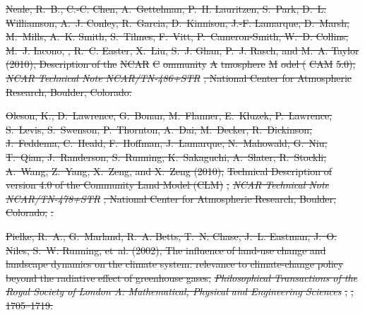 \documentclass[draft,ms]{agutex}   %
\providecommand{\DIFdel}[1]{{\protect\color{red}\sout{#1}}}                      %
\begin{document}
\begin{article}
\DIFdel{Neale, R.~B., C.-C. Chen, A.~Gettelman, P.~H. Lauritzen, S.~Park, D.~L.
  Williamson, A.~J. Conley, R.~Garcia, D.~Kinnison, J.-F. Lamarque, D.~Marsh,
  M.~Mills, A.~K. Smith, S.~Tilmes, F.~Vitt, P.~Cameron-Smith, W.~D. Collins,
  M.~J. Iacono, , R.~C. Easter, X.~Liu, S.~J. Ghan, P.~J. Rasch, and M.~A.
  Taylor (2010), Description of the }%
\DIFdel{NCAR}%
\DIFdel{C}%
\DIFdel{ommunity }%
\DIFdel{A}%
\DIFdel{tmosphere }%
\DIFdel{M}%
\DIFdel{odel
  (}%
\DIFdel{CAM}%
\DIFdel{5.0), }\textit{\DIFdel{NCAR Technical Note NCAR/TN-486+STR}}%
\DIFdel{, National Center
  for Atmospheric Research, Boulder, Colorado.
}%

\DIFdel{Oleson, K., D.~Lawrence, G.~Bonan, M.~Flanner, E.~Kluzek, P.~Lawrence,
  S.~Levis, S.~Swenson, P.~Thornton, A.~Dai, M.~Decker, R.~Dickinson,
  J.~Feddema, C.~Heald, F.~Hoffman, J.~Lamarque, N.~Mahowald, G.~Niu, T.~Qian,
  J.~Randerson, S.~Running, K.~Sakaguchi, A.~Slater, R.~Stockli, A.~Wang,
  Z.~Yang, X.~Zeng, and X.~Zeng (2010), }%
\DIFdel{Technical Description of version 4.0
  of the Community Land Model (CLM)}%
\DIFdel{, }\textit{\DIFdel{NCAR Technical Note
  NCAR/TN-478+STR}}%
\DIFdel{, National Center for Atmospheric Research, Boulder,
  Colorado, }%
\DIFdel{.
}%

\DIFdel{Pielke, R.~A., G.~Marland, R.~A. Betts, T.~N. Chase, J.~L. Eastman, J.~O.
  Niles, S.~W. Running, et~al. (2002), The influence of land-use change and
  landscape dynamics on the climate system: relevance to climate-change policy
  beyond the radiative effect of greenhouse gases, }\textit{\DIFdel{Philosophical
  Transactions of the Royal Society of London A: Mathematical, Physical and
  Engineering Sciences}}%
\DIFdel{, }%
\DIFdel{, 1705--1719.
}%


\end{article}
\end{document}
